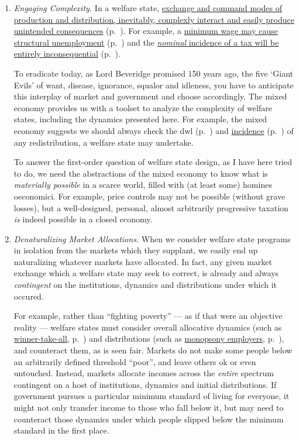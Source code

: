 \begin{enumerate}
	\item \emph{Engaging Complexity.}
	In a welfare state, \hyperref[sec:interface]{exchange and command modes of production and distribution, inevitably, complexly interact and easily produce unintended consequences} (p.~\pageref{sec:interface}).
	For example, a \hyperref[sec:price-controls]{minimum wage may cause structural unemployment} (p.~\pageref{sec:price-controls}) and the \hyperref[sec:well-determined-incidence]{\emph{nominal} incidence of a tax will be entirely inconsequential} (p.~\pageref{sec:well-determined-incidence}).

	To eradicate today, as Lord Beveridge promised 150 years ago, the five `Giant Evils' of want, disease, ignorance, squalor and idleness, you have to anticipate this interplay of market and government and choose accordingly.
	The mixed economy provides us with a toolset to analyze the complexity of welfare states, including the dynamics presented here.
	For example, the mixed economy suggests we should always check the \gls{dwl} (p.~\pageref{sec:minimal-DWL}) and \hyperref[sec:well-determined-incidence]{incidence} (p.~\pageref{sec:well-determined-incidence}) of any redistribution, a welfare state may undertake.

	To answer the first-order question of welfare state design, as I have here tried to do, we need the abstractions of the mixed economy to know what is \emph{materially possible} in a scarce world, filled with (at least some) homines oeconomici.
	For example, price controls may not be possible (without grave losses), but a well-designed, personal, almost arbitrarily progressive taxation \emph{is} indeed possible in a closed economy.

	\item \emph{Denaturalizing Market Allocations.}
	When we consider welfare state programs in isolation from the markets which they supplant, we easily end up naturalizing whatever markets have allocated.
	In fact, any given market exchange which a welfare state may seek to correct, is already and always \emph{contingent} on the institutions, dynamics and distributions under which it occured.

	For example, rather than ``fighting poverty'' --- as if that were an objective reality --- welfare states must consider overall allocative dynamics (such as \hyperref[sec:winner-take-all]{winner-take-all}, p.~\pageref{sec:winner-take-all}) and distributions (such as \hyperref[sec:monopsony-employers]{monopsony employers}, p.~\pageref{sec:monopsony-employers}), and counteract them, as is seen fair.
	Markets do not make some people below an arbitrarily defined threshold ``poor'', and leave others ok or even untouched.
	Instead, markets allocate incomes across the \emph{entire} spectrum contingent on a host of institutions, dynamics and initial distributions.
	If government pursues a particular minimum standard of living for everyone, it might not only transfer income to those who fall below it, but may need to counteract those dynamics under which people slipped below the minimum standard in the first place.


\end{enumerate}
